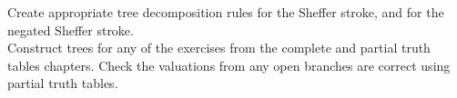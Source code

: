 \documentclass[PHIL101-Textbook.tex]{subfiles}
\begin{document}
Create appropriate tree decomposition rules for the Sheffer stroke, and for the negated Sheffer stroke.\\

\noindent \problempart 
Construct trees for any of the exercises from the complete and partial truth tables chapters. Check the valuations from any open branches are correct using partial truth tables.
\end{document}
